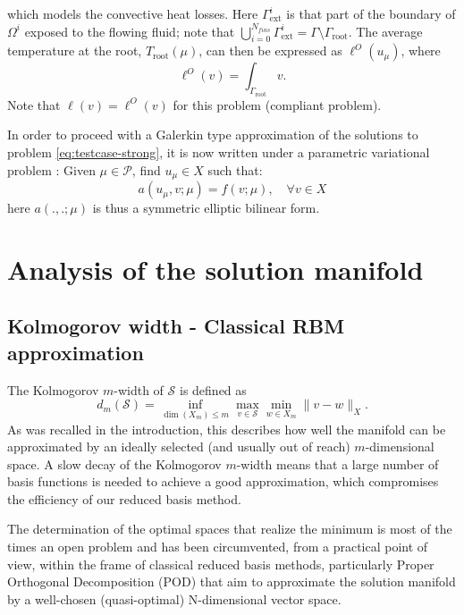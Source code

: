 \documentclass[graybox]{svmult}
\begin{document}
which models the convective heat losses. Here $\Gamma^i_{\text{ext}}$ is that part of the boundary of $\Omega^i$ exposed to the flowing fluid; note that $\bigcup_{i=0}^{N_{fins}}\Gamma^i_{\text{ext}} = \Gamma\setminus\Gamma_{\text{root}}$. The average temperature at the root, $T_{\text{root}}(\mu)$, can then be expressed as $\ell^O(u_\mu)$, where
\begin{equation}
\label{eq:testcase-output}
\ell^O(v) = \int_{\Gamma_{\text{root}}} v.
\end{equation}
Note that $\ell(v) = \ell^O(v)$ for this problem (compliant problem).

In order to proceed with a Galerkin type approximation of the solutions to problem \eqref{eq:testcase-strong}, it is now written under a  parametric variational problem :
Given $\mu \in {\mathcal P}$, find $u_\mu \in X$ such that:
\begin{equation}
  \label{eq:varpb}
 a(u_\mu,v;\mu) = f(v;\mu), \quad \forall v \in X
\end{equation}
here $a(.,.;\mu)$ is thus a symmetric elliptic bilinear form.

\section{Analysis of the solution manifold}
\label{sec:3}
\subsection{Kolmogorov width - Classical RBM approximation}
\label{subsec:3.1}

The  Kolmogorov $m$-width of ${\mathcal S}$ is defined as
\begin{equation}\label{kw}
    d_m({\mathcal S}) = 
    \inf_{\dim(X_m)\leq m}  \max_{v\in {\mathcal S}}
    \min_{w\in X_m} \| v -w\|_X.
\end{equation}
As was recalled in the introduction, this describes how well the manifold can be approximated
by an ideally selected (and usually out of reach) $m$-dimensional space. A slow decay of the Kolmogorov $m$-width means that a large number of basis functions is needed to achieve a good approximation, which compromises the efficiency of our reduced basis method.

The determination of the optimal spaces that realize the minimum is most of the times an open problem and has been circumvented, from a practical point of view, within the frame of classical reduced basis methods, particularly Proper Orthogonal Decomposition (POD) that aim to approximate the solution manifold by a well-chosen (quasi-optimal) N-dimensional vector space.  
\end{document}

